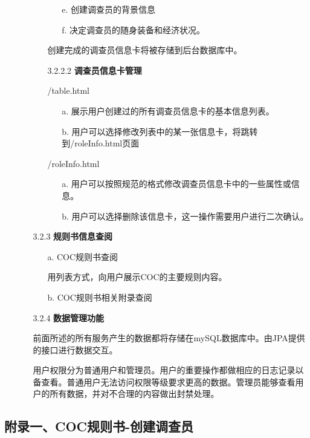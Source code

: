 \documentclass[a4paper,UTF8]{article}
\theoremstyle{definition}
\begin{document}
\begin{CJK}{UTF8}{gkai}
\begin{enumerate}
\begin{enumerate}
\begin{enumerate}
\begin{enumerate}
				\item[e.] 创建调查员的背景信息
				\item[f.] 决定调查员的随身装备和经济状况。
			\end{enumerate}
			\par 创建完成的调查员信息卡将被存储到后台数据库中。
			\item[3.2.2.2] \textbf{调查员信息卡管理}
			\par /table.html
			\begin{enumerate}
				\item[a.] 展示用户创建过的所有调查员信息卡的基本信息列表。
				\item[b.] 用户可以选择修改列表中的某一张信息卡，将跳转到/roleInfo.html页面
			\end{enumerate}
			\par /roleInfo.html
			\begin{enumerate}
				\item[a.] 用户可以按照规范的格式修改调查员信息卡中的一些属性或信息。
				\item[b.] 用户可以选择删除该信息卡，这一操作需要用户进行二次确认。
			\end{enumerate}
		\end{enumerate}
		\item[3.2.3] \textbf{规则书信息查阅}
		\begin{enumerate}
			\item[a.] COC规则书查阅
			\par 用列表方式，向用户展示COC的主要规则内容。
			\item[b.] COC规则书相关附录查阅
		\end{enumerate}
		\item[3.2.4] \textbf{数据管理功能}
		\par 前面所述的所有服务产生的数据都将存储在mySQL数据库中。由JPA提供的接口进行数据交互。
		\par 用户权限分为普通用户和管理员。用户的重要操作都做相应的日志记录以备查看。普通用户无法访问权限等级要求更高的数据。管理员能够查看用户的所有数据，并对不合理的内容做出封禁处理。
	\end{enumerate}
\end{enumerate}
\begin{flushleft}
\begin{CJK*}{UTF8}{gbsn}
\section*{附录一、COC规则书-创建调查员}
\end{CJK*}
\end{flushleft}




\end{CJK}
\end{document}
